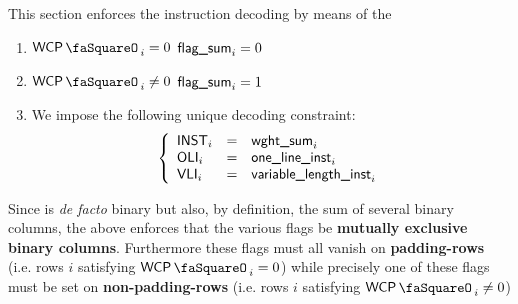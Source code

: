 This section enforces the instruction decoding by means of the 
\begin{enumerate}
	\item \If $\wcpStamp_{i} =    0$ \Then $\textsf{flag\_sum}_{i} = 0$
	\item \If $\wcpStamp_{i} \neq 0$ \Then $\textsf{flag\_sum}_{i} = 1$
	\item We impose the following unique decoding constraint:
		\[
			\left\{ \begin{array}{lcl}
				\textsf{INST}_{i} & = & \textsf{wght\_sum}_{i} \\
				\textsf{OLI}_{i}  & = & \textsf{one\_line\_inst}_{i} \\
				\textsf{VLI}_{i}  & = & \textsf{variable\_length\_inst}_{i} \\
			\end{array} \right.
		\]
\end{enumerate}
\saNote{}\label{wcp: note: IS_XXX are exclusive binary columns} Since \locFlagSum{} is \emph{de facto} binary but also, by definition, the sum of several binary  columns, the above enforces that the various  flags be \textbf{mutually exclusive binary columns}. Furthermore these flags must all vanish on \textbf{padding-rows} (i.e. rows $i$ satisfying $\wcpStamp_{i} = 0$) while precisely one of these flags must be set on \textbf{non-padding-rows} (i.e. rows $i$ satisfying $\wcpStamp_{i} \neq 0$)
